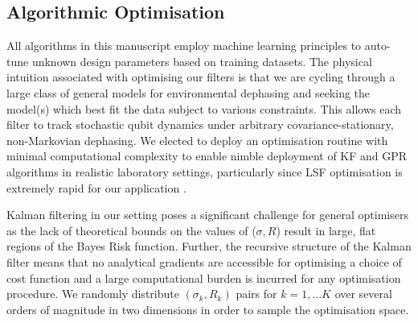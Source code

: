 \subsection{Algorithmic Optimisation \label{sec:main:Optimisation}}

All algorithms in this manuscript employ machine learning principles to auto-tune unknown design parameters based on training datasets. The physical intuition associated with optimising our filters is that we are cycling through a large class of general models for environmental dephasing and seeking the model(s) which best fit the data subject to various constraints. This allows each filter to track stochastic qubit dynamics under arbitrary covariance-stationary, non-Markovian dephasing.  We elected to deploy an optimisation routine with minimal computational complexity to enable nimble deployment of KF and GPR algorithms in realistic laboratory settings, particularly since LSF optimisation is extremely rapid for our application \cite{mavadia2017}. 



Kalman filtering in our setting poses a significant challenge for general optimisers as the lack of theoretical bounds on the values of ($\sigma, R$) result in large, flat regions of the Bayes Risk function. Further, the recursive structure of the Kalman filter means that no analytical gradients are accessible for optimising a choice of cost function and a large computational burden is incurred for any optimisation procedure. We randomly distribute $(\sigma_{k}, R_{k})$ pairs for $k=1, \hdots K $ over several orders of magnitude in two dimensions in order to sample the optimisation space.

\iffalse %
\begin{align}
\sigma_k, R_k &\equiv \iota_0 10^{\iota_1} \\
\iota_0 & \sim \mathcal{U}[0, 1]\\
\iota_1 & \sim \mathcal{U}[\{ -\iota_{max}, -\iota_{max} + 1,  \hdots,  \iota_{min}\}]
\end{align}
Scale magnitudes are set by $\iota_1$, a random integer chosen with uniform probability over $\{ -\iota_{max}, \hdots, \iota_{min} \}$ where we set $\iota_{min} = 3, \iota_{max} = 8$  such that $10^{-\iota_{max}}$ is sufficiently high to avoid machine floating point errors from recursive calculations over $> 10^3$ measurements. Uniformly distributed floating points for $\sigma_k, R_k $ in each order of magnitude is set by $\iota_0$. 
\fi

